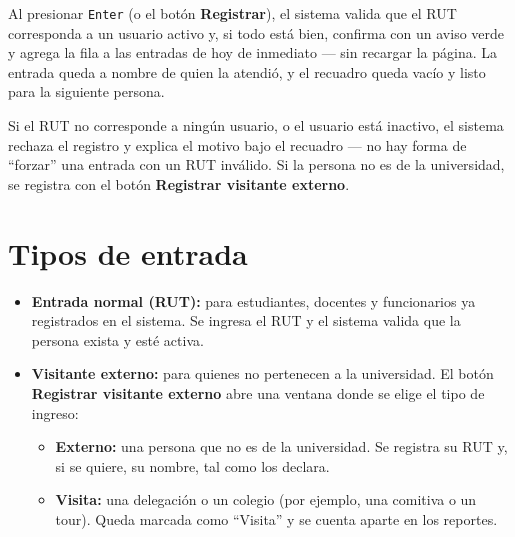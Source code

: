\documentclass[11pt,a4paper]{report}
\begin{document}

Al presionar \texttt{Enter} (o el botón \textbf{Registrar}), el
sistema valida que el RUT corresponda a un usuario activo y, si todo está
bien, confirma con un aviso verde y agrega la fila a las entradas de hoy
de inmediato --- sin recargar la página. La entrada queda a nombre de
quien la atendió, y el recuadro queda vacío y listo para la siguiente
persona.


\begin{nota}
Si el RUT no corresponde a ningún usuario, o el usuario está inactivo, el
sistema rechaza el registro y explica el motivo bajo el recuadro --- no hay
forma de ``forzar'' una entrada con un RUT inválido. Si la persona no es
de la universidad, se registra con el botón \textbf{Registrar visitante
externo}.
\end{nota}

\section{Tipos de entrada}

\begin{itemize}
  \item \textbf{Entrada normal (RUT):} para estudiantes, docentes y
  funcionarios ya registrados en el sistema. Se ingresa el RUT y el
  sistema valida que la persona exista y esté activa.
  \item \textbf{Visitante externo:} para quienes no pertenecen a la
  universidad. El botón \textbf{Registrar visitante externo} abre una
  ventana donde se elige el tipo de ingreso:
  \begin{itemize}
    \item \textbf{Externo:} una persona que no es de la universidad. Se
    registra su RUT y, si se quiere, su nombre, tal como los declara.
    \item \textbf{Visita:} una delegación o un colegio (por ejemplo, una
    comitiva o un tour). Queda marcada como ``Visita'' y se cuenta aparte
    en los reportes.
  \end{itemize}
\end{itemize}

\end{document}
